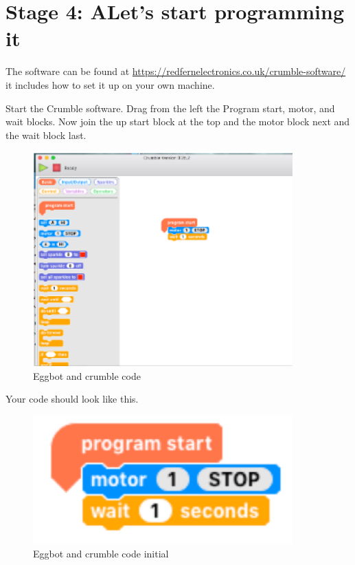 \section{Stage 4: ALet's start programming it}

The software can be found at \url{https://redfernelectronics.co.uk/crumble-software/} it includes how to set it up on your own machine.
 
Start the Crumble software. Drag from the left the Program start, motor, and wait blocks. Now join the up start block at the top and the motor block next and the wait block last.


\begin{figure}
    \centering
    \includegraphics[width=10cm]{chapters/ChapterP1/figures/eggbot_stage6.png}
    \caption{Eggbot and crumble code}
    \label{fig:EgggbotdrawingCrumble3}
\end{figure}

Your code should look like this.

\begin{figure}
    \centering
    \includegraphics[width=10cm]{chapters/ChapterP1/figures/eggbot_stage7.png}
    \caption{Eggbot and crumble code initial}
    \label{fig:EgggbotdrawingCrumble4}
\end{figure}

